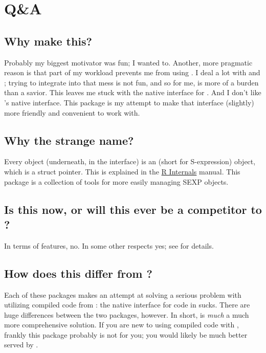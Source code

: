 \section{Q\&A}

\subsection{Why make this?}
Probably my biggest motivator was fun; I wanted to.  
Another, more pragmatic reason is that part of my workload prevents me from 
using .  I deal a lot with \C and \Fortran; trying to integrate \Cpp 
into that mess is not fun, and so for me,  is more of a burden than a 
savior.  This leaves me stuck with the native \C interface for \R.  And I don't 
like \R's native \C interface.  This package is my attempt to make that 
interface (slightly) more friendly and convenient to work with.


\subsection{Why the strange name?}
Every \R object (underneath, in the \C interface) is an  (short for
S-expression) object, which is a struct pointer.  This is explained in the
\href{http://cran.r-project.org/doc/manuals/R-ints.html#SEXPs}{R Internals} 
manual.  This package is a collection of tools for more easily managing SEXP 
objects.


\subsection{Is this now, or will this ever be a competitor to ?}
In terms of features, no.  In some other respects yes; see  for
details.


\subsection{How does this differ from ?}\label{sec:rcppdiffs}
Each of these packages makes an attempt at solving a serious problem with 
utilizing compiled code from \R: the native interface for  code in 
\R sucks.  There are huge differences between the two packages, however. In 
short,  is \emph{much} a much more comprehensive solution.  If you are 
new to using compiled code with \R, frankly this package probably is not for 
you; you would likely be much better served by .  

